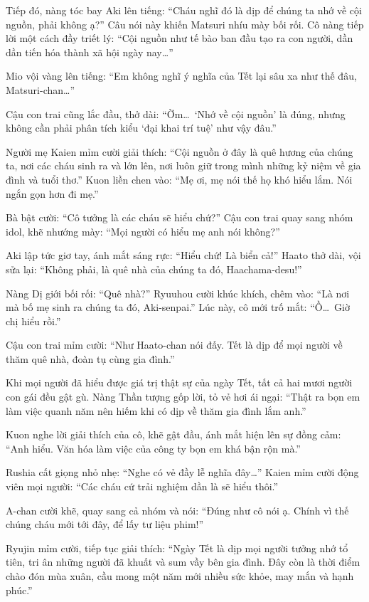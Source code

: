 \documentclass[../main.tex]{subfiles}
\begin{document}
Tiếp đó, nàng tóc bay Aki lên tiếng: ``Cháu nghĩ đó là dịp để chúng ta nhớ về cội nguồn, phải không ạ?'' Câu nói này khiến Matsuri nhíu mày bối rối. Cô nàng tiếp lời một cách đầy triết lý: ``Cội nguồn như tế bào ban đầu tạo ra con người, dần dần tiến hóa thành xã hội ngày nay\dots''

Mio vội vàng lên tiếng: ``Em không nghĩ ý nghĩa của Tết lại sâu xa như thế đâu, Matsuri-chan\dots''

Cậu con trai cũng lắc đầu, thở dài: ``Ờm\dots\ `Nhớ về cội nguồn' là đúng, nhưng không cần phải phân tích kiểu `đại khai trí tuệ' như vậy đâu.''

Người mẹ Kaien mỉm cười giải thích: ``Cội nguồn ở đây là quê hương của chúng ta, nơi các cháu sinh ra và lớn lên, nơi luôn giữ trong mình những kỷ niệm về gia đình và tuổi thơ.'' Kuon liền chen vào: ``Mẹ ơi, mẹ nói thế họ khó hiểu lắm. Nói ngắn gọn hơn đi mẹ.''

Bà bật cười: ``Cô tưởng là các cháu sẽ hiểu chứ?'' Cậu con trai quay sang nhóm idol, khẽ nhướng mày: ``Mọi người có hiểu mẹ anh nói không?''

Aki lập tức giơ tay, ánh mắt sáng rực: ``Hiểu chứ! Là biển cả!'' Haato thở dài, vội sửa lại: ``Không phải, là quê nhà của chúng ta đó, Haachama-desu!''

Nàng Dị giới bối rối: ``Quê nhà?'' Ryuuhou cười khúc khích, chêm vào: ``Là nơi mà bố mẹ sinh ra chúng ta đó, Aki-senpai.'' Lúc này, cô mới trố mắt: ``Ồ\dots\ Giờ chị hiểu rồi.''

Cậu con trai mỉm cười: ``Như Haato-chan nói đấy. Tết là dịp để mọi người về thăm quê nhà, đoàn tụ cùng gia đình.''

Khi mọi người đã hiểu được giá trị thật sự của ngày Tết, tất cả hai mươi người con gái đều gật gù. Nàng Thần tượng gốp lời, tỏ vẻ hơi ái ngại: ``Thật ra bọn em làm việc quanh năm nên hiếm khi có dịp về thăm gia đình lắm anh.''

Kuon nghe lời giải thích của cô, khẽ gật đầu, ánh mắt hiện lên sự đồng cảm: ``Anh hiểu. Văn hóa làm việc của công ty bọn em khá bận rộn mà.''

Rushia cất giọng nhỏ nhẹ: ``Nghe có vẻ đầy lễ nghĩa đây\dots'' Kaien mỉm cười động viên mọi người: ``Các cháu cứ trải nghiệm dần là sẽ hiểu thôi.''

A-chan cười khẽ, quay sang cả nhóm và nói: ``Đúng như cô nói ạ. Chính vì thế chúng cháu mới tới đây, để lấy tư liệu phim!''

Ryujin mỉm cười, tiếp tục giải thích: ``Ngày Tết là dịp mọi người tưởng nhớ tổ tiên, tri ân những người đã khuất và sum vầy bên gia đình. Đây còn là thời điểm chào đón mùa xuân, cầu mong một năm mới nhiều sức khỏe, may mắn và hạnh phúc.''
\end{document}
